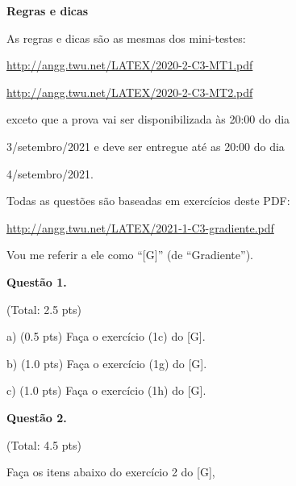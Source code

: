 \documentclass[oneside,12pt]{article}
\begin{document}
\newpage


{\bf Regras e dicas}

As regras e dicas são as mesmas dos mini-testes:

\ssk

\url{http://angg.twu.net/LATEX/2020-2-C3-MT1.pdf}

\url{http://angg.twu.net/LATEX/2020-2-C3-MT2.pdf}

\ssk

exceto que a prova vai ser disponibilizada às 20:00 do dia

3/setembro/2021 e deve ser entregue até as 20:00 do dia

4/setembro/2021.



\bsk
\bsk

Todas as questões são baseadas em exercícios deste PDF:

\ssk

{\footnotesize

\url{http://angg.twu.net/LATEX/2021-1-C3-gradiente.pdf}

}

\ssk

Vou me referir a ele como ``[G]'' (de ``Gradiente'').

\newpage


{\bf Questão 1.}

\T(Total: 2.5 pts)

\ssk

a) \B(0.5 pts) Faça o exercício (1c) do [G].

b) \B(1.0 pts) Faça o exercício (1g) do [G].

c) \B(1.0 pts) Faça o exercício (1h) do [G].


\newpage


{\bf Questão 2.}

\T(Total: 4.5 pts)

\ssk

Faça os itens abaixo do exercício 2 do [G],
\end{document}
